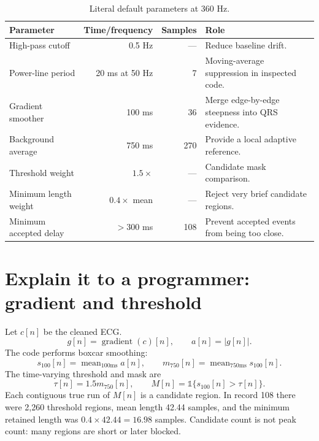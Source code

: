\documentclass[11pt]{article}
\begin{document}
\begin{table}[H]
\centering
\caption{Literal default parameters at 360 Hz.}
\begin{tabularx}{\linewidth}{@{}lrrY@{}}
\toprule
Parameter & Time/frequency & Samples & Role \\
\midrule
High-pass cutoff & 0.5 Hz & --- & Reduce baseline drift. \\
Power-line period & 20 ms at 50 Hz & 7 & Moving-average suppression in inspected code. \\
Gradient smoother & 100 ms & 36 & Merge edge-by-edge steepness into QRS evidence. \\
Background average & 750 ms & 270 & Provide a local adaptive reference. \\
Threshold weight & \(1.5\times\) & --- & Candidate mask comparison. \\
Minimum length weight & \(0.4\times\) mean & --- & Reject very brief candidate regions. \\
Minimum accepted delay & \(>300\) ms & 108 & Prevent accepted events from being too close. \\
\bottomrule
\end{tabularx}
\end{table}

\clearpage
\section{Explain it to a programmer: gradient and threshold}
Let \(c[n]\) be the cleaned ECG.
\[
g[n]=\operatorname{gradient}(c)[n],\qquad a[n]=|g[n]|.
\]
The code performs boxcar smoothing:
\[
s_{100}[n]=\operatorname{mean}_{100\mathrm{ms}}a[n],\qquad
m_{750}[n]=\operatorname{mean}_{750\mathrm{ms}}s_{100}[n].
\]
The time-varying threshold and mask are
\[
\tau[n]=1.5m_{750}[n],\qquad M[n]=\mathbb{1}\{s_{100}[n]>\tau[n]\}.
\]
Each contiguous true run of \(M[n]\) is a candidate region.  In record 108 there were 2,260 threshold regions, mean length 42.44 samples, and the minimum retained length was \(0.4\times42.44=16.98\) samples.  Candidate count is not peak count: many regions are short or later blocked.
\end{document}
